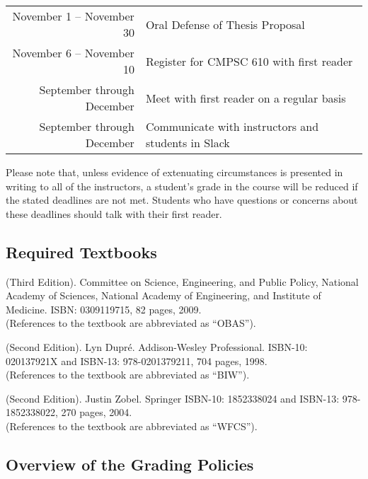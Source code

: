 \documentclass[11pt]{article}
\begin{document}
\begin{center}
\begin{longtable}{r|l}
\hline

November 1 -- November 30 & Oral Defense of Thesis Proposal          \\
November 6 -- November 10 & Register for CMPSC 610 with first reader \\

\hline

September through December & Meet with first reader on a regular basis          \\
September through December & Communicate with instructors and students in Slack \\

\hline

\end{longtable}
\end{center}

\vspace*{-.25in}

\noindent Please note that, unless evidence of extenuating circumstances is
presented in writing to all of the instructors, a student's grade in the course
will be reduced if the stated deadlines are not met. Students who have questions
or concerns about these deadlines should talk with their first reader.

\subsection*{Required Textbooks}

(Third Edition).  Committee on Science, Engineering, and Public Policy, National
Academy of Sciences, National Academy of Engineering, and Institute of Medicine.
ISBN: 0309119715, 82 pages, 2009.\\ (References to the textbook are abbreviated
as ``OBAS'').

 (Second
Edition). Lyn Dupr\'e.  Addison-Wesley Professional.  ISBN-10: 020137921X and
ISBN-13: 978-0201379211, 704 pages, 1998.\\ (References to the textbook are
abbreviated as ``BIW'').

 (Second Edition).  Justin Zobel.
Springer ISBN-10: 1852338024 and ISBN-13: 978-1852338022, 270 pages, 2004. \\
(References to the textbook are abbreviated as ``WFCS'').

\subsection*{Overview of the Grading Policies}
\end{document}
